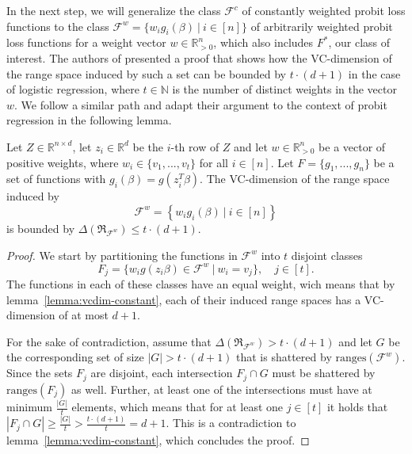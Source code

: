In the next step, we will generalize the class $\mathcal{F}^c$
of constantly weighted probit loss functions to the class
$\mathcal{F}^w = \{w_ig_i(\beta)\ |\ i \in [n]\}$ of arbitrarily
weighted probit loss functions for a weight vector
$w \in \mathbb{R}^n_{>0}$, which also includes $F^\ast$,
our class of interest.
The authors of \cite{on-coresets} presented a proof that shows
how the VC-dimension of the range space induced by such a
set can be bounded by $t\cdot(d+1)$ in the case of logistic
regression, where $t \in \mathbb{N}$ is the number of distinct
weights in the vector $w$.
We follow a similar path and adapt their argument to the
context of probit regression in the following lemma.

\begin{lemma}
    Let $Z \in \mathbb{R}^{n \times d}$, let $z_i \in \mathbb{R}^d$ be the
    $i$-th row of $Z$ and let
    $w \in \mathbb{R}^n_{>0}$ be a vector of positive weights,
    where $w_i \in \{ v_1, ..., v_t \}$ for all $i \in [n]$.
    Let $F = \{g_1, ..., g_n\}$ be a set of functions with
    $g_i(\beta) = g(z_i^T \beta)$.
    The VC-dimension of the range space induced by
    \begin{equation*}
        \mathcal{F}^w = \left\{ w_ig_i(\beta) \ |\ i \in [n] \right\}
    \end{equation*}
    is bounded by
    $\Delta(\mathfrak{R}_{\mathcal{F}^w}) \leq t \cdot (d + 1)$.
\end{lemma}
\begin{proof}
    We start by partitioning the functions in
    $\mathcal{F}^w$ into $t$ disjoint classes
    \begin{equation*}
        F_j = \{ w_ig(z_i\beta) \in \mathcal{F}^w \
        |\ w_i = v_j \},\quad j \in [t].
    \end{equation*}
    The functions in each of these classes have an equal
    weight, wich means that by lemma~\ref{lemma:vcdim-constant}, each of
    their induced range spaces has a VC-dimension of at most $d+1$.

    For the sake of contradiction, assume that
    $\Delta(\mathfrak{R}_{\mathcal{F}^w}) > t \cdot (d + 1)$ and let
    $G$ be the corresponding set of size $|G| > t \cdot (d + 1)$ that
    is shattered by $\text{ranges}(\mathcal{F}^w)$.
    Since the sets $F_j$ are disjoint, each intersection
    $F_j \cap G$ must be shattered by $\text{ranges}(F_j)$ as well.
    Further, at least one of the intersections must have at minimum
    $\frac{|G|}{t}$ elements, which means that for at least one $j \in [t]$
    it holds that
    $|F_j \cap G| \geq \frac{|G|}{t} > \frac{t \cdot (d+1)}{t} = d + 1$.
    This is a contradiction to lemma~\ref{lemma:vcdim-constant}, which
    concludes the proof.
\end{proof}

